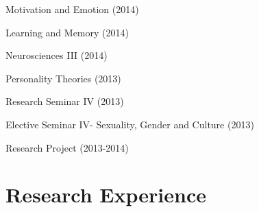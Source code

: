 \documentclass[11pt,a4paper,]{awesome-cv}
\begin{document}
\begin{cventries}
{\begin{cvitems}
\item Motivation and Emotion (2014)
\item Learning and Memory (2014)
\item Neurosciences III (2014)
\item Personality Theories (2013)
\item Research Seminar IV (2013)
\item Elective Seminar IV- Sexuality, Gender and Culture (2013)
\item Research Project (2013-2014)
\end{cvitems}}
\end{cventries}

\section{Research Experience}\label{research-experience}
\end{document}
